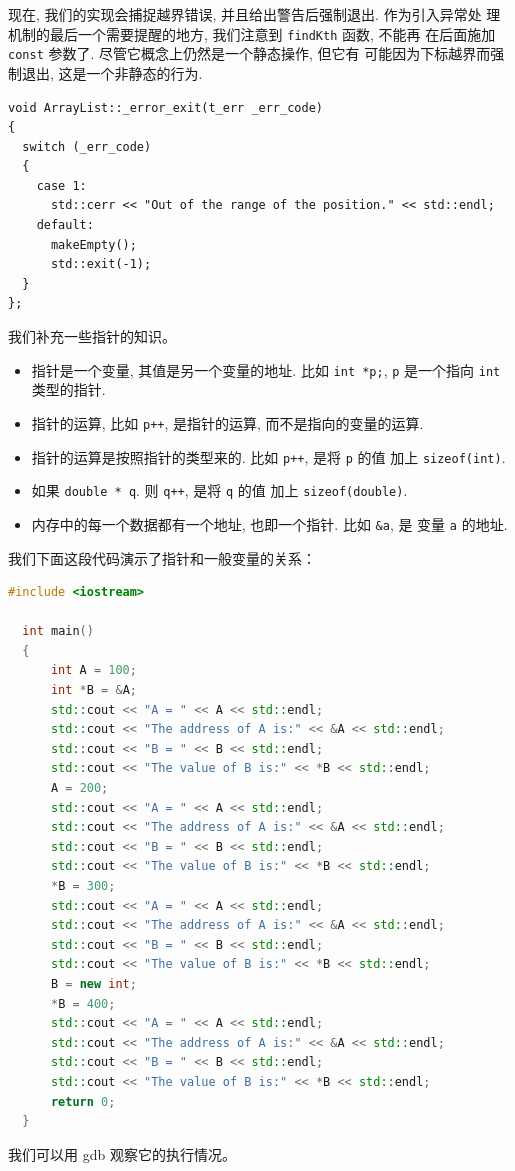 \documentclass[a4paper]{ctexart}
\theoremstyle{definition}
\theoremstyle{definition}
\begin{document}
现在, 我们的实现会捕捉越界错误, 并且给出警告后强制退出. 作为引入异常处
理机制的最后一个需要提醒的地方, 我们注意到 \verb|findKth| 函数, 不能再
在后面施加 \verb|const| 参数了. 尽管它概念上仍然是一个静态操作, 但它有
可能因为下标越界而强制退出, 这是一个非静态的行为. 
\begin{verbatim}
void ArrayList::_error_exit(t_err _err_code)
{
  switch (_err_code)
  {
    case 1:
      std::cerr << "Out of the range of the position." << std::endl;
    default:
      makeEmpty();
      std::exit(-1);
  }
};
\end{verbatim}

我们补充一些指针的知识。

\begin{itemize}
  \item 指针是一个变量, 其值是另一个变量的地址. 比如 \verb|int *p;|, 
    \verb|p| 是一个指向 \verb|int| 类型的指针. 
  \item 指针的运算, 比如 \verb|p++|, 是指针的运算, 而不是指向的变量的运算.
  \item 指针的运算是按照指针的类型来的. 比如 \verb|p++|, 是将 \verb|p| 的值
    加上 \verb|sizeof(int)|.
  \item 如果 \verb|double * q|. 则 \verb|q++|, 是将 \verb|q| 的值
    加上 \verb|sizeof(double)|.
  \item 内存中的每一个数据都有一个地址, 也即一个指针. 比如 \verb|&a|, 是
    变量 \verb|a| 的地址.
\end{itemize}

我们下面这段代码演示了指针和一般变量的关系：

\begin{lstlisting}[language=C++]
  #include <iostream>

  int main()
  {
      int A = 100;
      int *B = &A;
      std::cout << "A = " << A << std::endl;
      std::cout << "The address of A is:" << &A << std::endl;
      std::cout << "B = " << B << std::endl;
      std::cout << "The value of B is:" << *B << std::endl;
      A = 200;
      std::cout << "A = " << A << std::endl;
      std::cout << "The address of A is:" << &A << std::endl;
      std::cout << "B = " << B << std::endl;
      std::cout << "The value of B is:" << *B << std::endl;
      *B = 300;
      std::cout << "A = " << A << std::endl;
      std::cout << "The address of A is:" << &A << std::endl;
      std::cout << "B = " << B << std::endl;
      std::cout << "The value of B is:" << *B << std::endl;
      B = new int;
      *B = 400;
      std::cout << "A = " << A << std::endl;
      std::cout << "The address of A is:" << &A << std::endl;
      std::cout << "B = " << B << std::endl;
      std::cout << "The value of B is:" << *B << std::endl;
      return 0;
  }  
\end{lstlisting}
我们可以用 gdb 观察它的执行情况。
\end{document}
